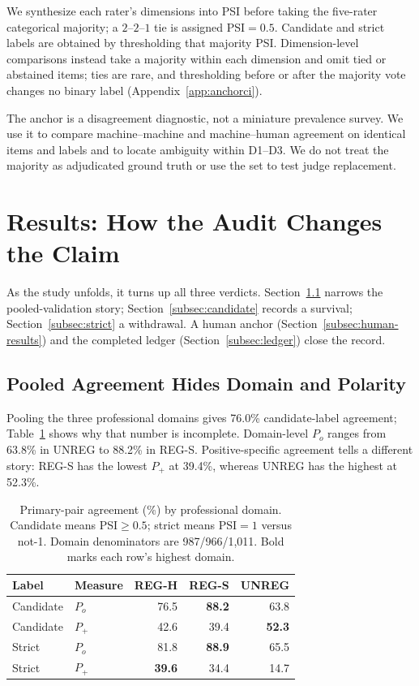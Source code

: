 \documentclass[11pt]{article}
\begin{document}
We synthesize each rater's dimensions into PSI before taking the five-rater categorical majority; a $2$--$2$--$1$ tie is assigned PSI$=0.5$. Candidate and strict labels are obtained by thresholding that majority PSI. Dimension-level comparisons instead take a majority within each dimension and omit tied or abstained items; ties are rare, and thresholding before or after the majority vote changes no binary label (Appendix~\ref{app:anchorci}).

The anchor is a disagreement diagnostic, not a miniature prevalence survey. We use it to compare machine--machine and machine--human agreement on identical items and labels and to locate ambiguity within D1--D3. We do not treat the majority as adjudicated ground truth or use the set to test judge replacement.

\section{Results: How the Audit Changes the Claim}
\label{sec:results}

As the study unfolds, it turns up all three verdicts. Section~\ref{subsec:agreement} narrows the pooled-validation story; Section~\ref{subsec:candidate} records a survival; Section~\ref{subsec:strict} a withdrawal. A human anchor (Section~\ref{subsec:human-results}) and the completed ledger (Section~\ref{subsec:ledger}) close the record.

\subsection{Pooled Agreement Hides Domain and Polarity}
\label{subsec:agreement}

Pooling the three professional domains gives 76.0\% candidate-label agreement; Table~\ref{tab:agreement} shows why that number is incomplete. Domain-level $P_o$ ranges from 63.8\% in UNREG to 88.2\% in REG-S. Positive-specific agreement tells a different story: REG-S has the lowest $P_+$ at 39.4\%, whereas UNREG has the highest at 52.3\%.

\begin{table}[t]
\centering
\small
\setlength{\tabcolsep}{4pt}
\begin{tabular}{@{}llrrr@{}}
\toprule
Label & Measure & REG-H & REG-S & UNREG \\
\midrule
Candidate & $P_o$ & 76.5 & \textbf{88.2} & 63.8 \\
Candidate & $P_+$ & 42.6 & 39.4 & \textbf{52.3} \\
\midrule
Strict & $P_o$ & 81.8 & \textbf{88.9} & 65.5 \\
Strict & $P_+$ & \textbf{39.6} & 34.4 & 14.7 \\
\bottomrule
\end{tabular}
\caption{Primary-pair agreement (\%) by professional domain. Candidate means PSI$\geq0.5$; strict means PSI$=1$ versus not-1. Domain denominators are 987/966/1,011. Bold marks each row's highest domain.}
\label{tab:agreement}
\end{table}
\end{document}
